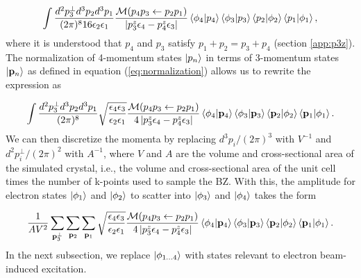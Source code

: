 \documentclass{article}
\begin{document}
\begin{equation} 
  \label{eq:ampUseDelta} 
  \begin{aligned} 
    \int\frac{d^2p_3^\perp
    d^3p_2d^3p_1} {(2\pi)^{8} 16\epsilon_2\epsilon_1}
    \frac{\mathcal{M}(p_4p_3\leftarrow p_2p_1)}
    {\left|p_3^z\epsilon_4 - p_4^z\epsilon_3\right|} \bra{\phi_4}\ket{p_4}
    \bra{\phi_3}\ket{p_3} \bra{p_2}\ket{\phi_2} \bra{p_1}\ket{\phi_1},
  \end{aligned} 
\end{equation}
%
where it is understood that $p_4$ and $p_3$ satisfy $p_1 + p_2 = p_3 + p_4$
(section \ref{app:p3z}).
The normalization of 4-momentum states $\ket{p_n}$ in terms of
3-momentum states $\ket{\mathbf{p}_n}$ as defined in equation
(\ref{eq:normalization}) allows us to rewrite the expression as

\begin{equation} 
  \label{eq:amp3Mom} 
  \begin{aligned} 
    \int\frac{d^2p_3^\perp
    d^3p_2d^3p_1}{(2\pi)^{8}}
    \sqrt{\frac{\epsilon_4\epsilon_3}{\epsilon_2\epsilon_1}}
    \frac{\mathcal{M}(p_4p_3\leftarrow p_2p_1)} {4\left|p_3^z\epsilon_4 -
    p_4^z\epsilon_3\right|} \bra{\phi_4}\ket{\mathbf{p}_4}
    \bra{\phi_3}\ket{\mathbf{p}_3} \bra{\mathbf{p}_2}\ket{\phi_2}
    \bra{\mathbf{p}_1}\ket{\phi_1}.  
  \end{aligned} 
\end{equation}
%
We can then discretize the momenta by replacing $d^3p_i/(2\pi)^3$ with $V^{-1}$
and $d^2p_i^\perp/(2\pi)^2$ with $A^{-1}$, where $V$ and $A$ are the volume and
cross-sectional area of the simulated crystal, i.e., the volume and
cross-sectional area of the unit cell times the number of k-points used to
sample the BZ.
With this, the amplitude for electron states $\ket{\phi_1}$ and $\ket{\phi_2}$
to scatter into $\ket{\phi_3}$ and $\ket{\phi_4}$ takes the form

\begin{equation} 
  \label{eq:ampDisc} 
  \begin{aligned} 
    \frac{1}{AV^2}
    \sum_{\mathbf{p}_3^\perp} \sum_{\mathbf{p}_2} \sum_{\mathbf{p}_1}
    \sqrt{\frac{\epsilon_4\epsilon_3}{\epsilon_2\epsilon_1}}
    \frac{\mathcal{M}(p_4p_3\leftarrow p_2p_1)} {4\left|p_3^z\epsilon_4 -
    p_4^z\epsilon_3\right|} \bra{\phi_4}\ket{\mathbf{p}_4}
    \bra{\phi_3}\ket{\mathbf{p}_3} \bra{\mathbf{p}_2}\ket{\phi_2}
    \bra{\mathbf{p}_1}\ket{\phi_1}.  
  \end{aligned} 
\end{equation}
%
In the next subsection, we replace $\ket{\phi_{1\dots 4}}$ with states relevant to
electron beam-induced excitation.
\end{document}
